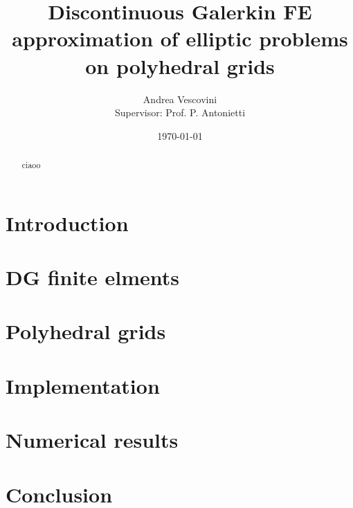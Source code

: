 \documentclass[12pt, a4paper]{article}
\title{\textbf{Discontinuous Galerkin FE approximation of elliptic problems on polyhedral grids}}
\author{Andrea Vescovini\\[1cm]{\small Supervisor: Prof. P. Antonietti}}
\date{\today}
\begin{document}
\maketitle
\newpage
\begin{abstract}
	ciaoo
\end{abstract}
\tableofcontents
\newpage



\section*{Introduction}

\section{DG finite elments}

\section{Polyhedral grids}

\section{Implementation}
	
\section{Numerical results}

\section{Conclusion}
\end{document}

